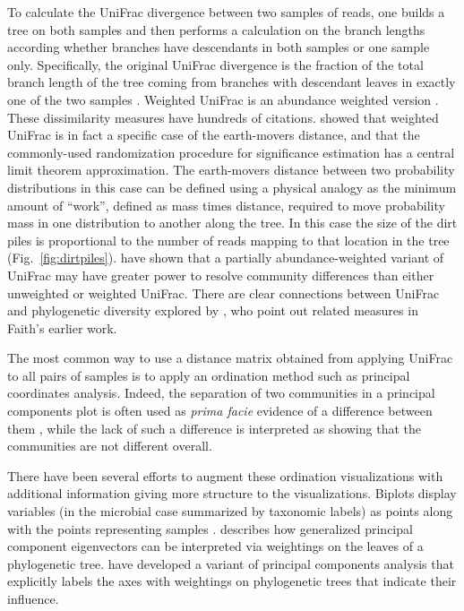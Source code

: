 \documentclass{amsart}
\begin{document}
To calculate the UniFrac divergence between two samples of reads, one builds a tree on both samples and then performs a calculation on the branch lengths according whether branches have descendants in both samples or one sample only.
Specifically, the original UniFrac divergence is the fraction of the total branch length of the tree coming from branches with descendant leaves in exactly one of the two samples \citep[Fig.~\ref{fig:unifrac};][]{LozuponeKnightUniFrac05}.
Weighted UniFrac is an abundance weighted version \citep{LozuponeEaWeightedUnifrac07}.
These dissimilarity measures have hundreds of citations.
\citet{evans2012phylogenetic} showed that weighted UniFrac is in fact a specific case of the earth-movers distance, and that the commonly-used randomization procedure for significance estimation has a central limit theorem approximation.
The earth-movers distance \citep{monge1781memoire,Villani2003-wv} between two probability distributions in this case can be defined using a physical analogy as the minimum amount of ``work'', defined as mass times distance, required to move probability mass in one distribution to another along the tree.
In this case the size of the dirt piles is proportional to the number of reads mapping to that location in the tree (Fig.~\ref{fig:dirtpiles}).
\citet{chen2012associating} have shown that a partially abundance-weighted variant of UniFrac may have greater power to resolve community differences than either unweighted or weighted UniFrac.
There are clear connections between UniFrac and phylogenetic diversity explored by \citet{faith2009cladistic}, who point out related measures in Faith's earlier work.

The most common way to use a distance matrix obtained from applying UniFrac to all pairs of samples is to apply an ordination method such as principal coordinates analysis.
Indeed, the separation of two communities in a principal components plot is often used as \emph{prima facie} evidence of a difference between them
\citep[e.g.][]{lozupone2007global,costello2009bacterial,yatsunenko2012human}, while the lack of such a difference is interpreted as showing that the communities are not different overall.

There have been several efforts to augment these ordination visualizations with additional information giving more structure to the visualizations.
Biplots display variables (in the microbial case summarized by taxonomic labels) as points along with the points representing samples \citep[e.g.][]{hewitt2013bacterial,lozupone2013meta}.
\citet{PurdomAnalyzingDataGraphs08} describes how generalized principal component eigenvectors can be interpreted via weightings on the leaves of a phylogenetic tree.
\citet{matsen2013edge} have developed a variant of principal components analysis that explicitly labels the axes with weightings on phylogenetic trees that indicate their influence.
\end{document}
